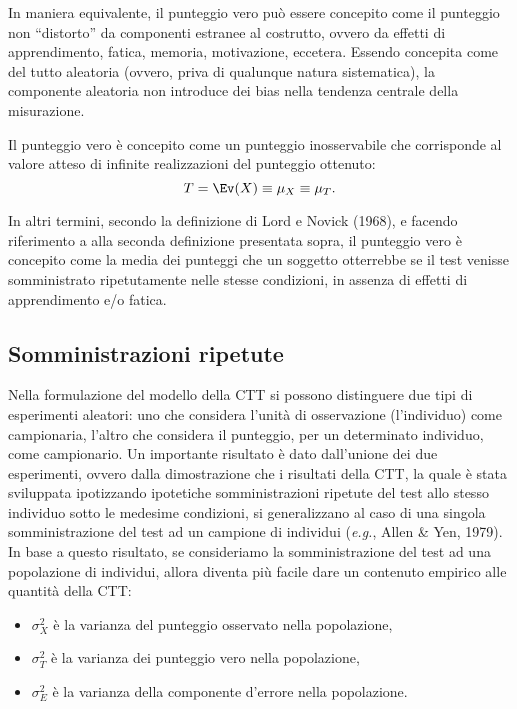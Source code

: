 In maniera equivalente, il punteggio vero può essere concepito come il punteggio non ``distorto'' da componenti estranee al costrutto, ovvero da effetti di apprendimento, fatica, memoria, motivazione, eccetera. Essendo concepita come del tutto aleatoria (ovvero, priva di qualunque natura sistematica), la componente aleatoria non introduce dei bias nella tendenza centrale della misurazione.

\begin{defn}
Il punteggio vero è  concepito come un punteggio inosservabile che corrisponde al valore atteso di infinite realizzazioni del punteggio ottenuto:
\begin{equation}
T = \Ev(X) \equiv \mu_X \equiv \mu_{T}.
\end{equation}
\end{defn}
In altri termini, secondo la definizione di Lord e Novick (1968), e facendo riferimento a alla seconda definizione presentata sopra, il punteggio vero è concepito come la media dei punteggi che un soggetto otterrebbe se il test venisse somministrato ripetutamente nelle stesse condizioni, in assenza di effetti di apprendimento e/o fatica.

\subsection{Somministrazioni ripetute}

Nella formulazione del modello della CTT si possono distinguere due tipi di esperimenti aleatori: uno che considera l'unità di osservazione (l'individuo) come campionaria, l'altro che considera il punteggio, per un determinato individuo, come campionario. 
Un importante risultato è dato dall'unione dei due esperimenti, ovvero dalla dimostrazione che i risultati della CTT, la quale è stata sviluppata ipotizzando ipotetiche somministrazioni ripetute del test allo stesso individuo sotto le medesime condizioni, si generalizzano al caso di una singola somministrazione del test ad un campione di individui (\emph{e.g.}, Allen \& Yen, 1979). In base a questo risultato, se consideriamo la somministrazione del test ad una popolazione di individui, allora diventa più facile dare un contenuto empirico alle quantità della CTT:
\begin{itemize} 
\item $\sigma^2_X$ è la varianza del punteggio osservato nella popolazione, 
\item $\sigma^2_T$ è la varianza dei punteggio vero nella popolazione,
\item $\sigma^2_E$ è la varianza della componente d'errore nella popolazione.
\end{itemize}

